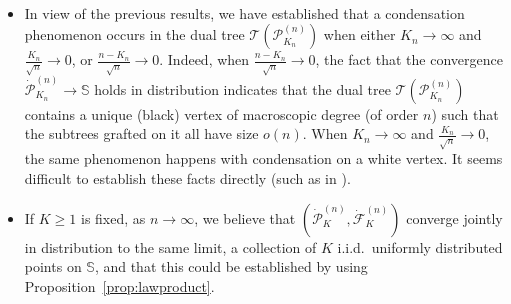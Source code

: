 \documentclass[AHL,XML,longabstracts,Unicode]{cedram}
\def\S{\mathbb{S}}
\def\PKn{\mathcal{P}^{(n)}_{K_{n}}}
\def\dPKn{\dot{\mathcal{P}}^{(n)}_{K_{n}}}
\begin{document}
\begin{remark}~
\begin{itemize}
\item In view of the previous results, we have established that a condensation phenomenon occurs in the dual tree $ \mathcal{T}(\PKn)$ when either $K_{n} \rightarrow \infty$ and $\tfrac{K_{n}}{\sqrt{n}} \rightarrow 0$, or $\tfrac{n-K_{n}}{\sqrt{n}} \rightarrow 0$. Indeed, when  $\tfrac{n-K_{n}}{\sqrt{n}} \rightarrow 0$, the fact that the convergence $\dPKn {\rightarrow} \S$ holds in distribution indicates that the dual tree  $ \mathcal{T}(\PKn)$ contains a unique (black) vertex of macroscopic degree (of order $n$)  such that the subtrees grafted on it all have size $o(n)$.  When $K_{n} \rightarrow \infty$ and $\tfrac{K_{n}}{\sqrt{n}} \rightarrow 0$, the same phenomenon happens with condensation on a white vertex.  It seems difficult to establish these facts directly (such as in \cite{AL11,Jan12,Kor15}).
\item If $K \geq 1$ is fixed, as $n \rightarrow \infty$, we believe that $(\dot{\mathcal{P}}^{(n)}_{K},\dot{\mathcal{F}}^{(n)}_{K})$ converge jointly in distribution to the same limit, a collection of $K$ i.i.d.~uniformly distributed points on $\S$, and that this could be established by using Proposition~\ref{prop:lawproduct}.
\end{itemize}
\end{remark}

%

\end{document}
